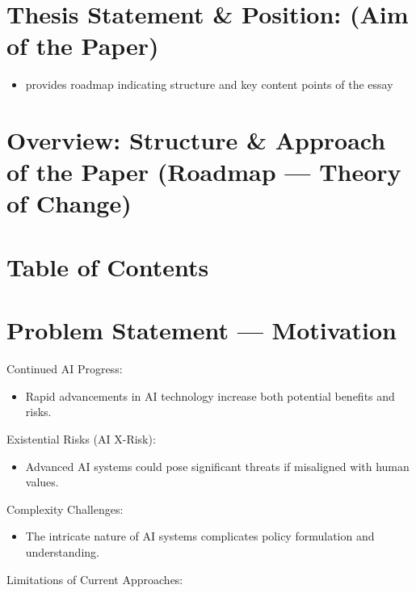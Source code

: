 \documentclass[
  letterpaper,
]{book}
\providecommand{\tightlist}{%
  \setlength{\itemsep}{0pt}\setlength{\parskip}{0pt}}
\begin{document}
\section{Thesis Statement \& Position: (Aim of the
Paper)}\label{thesis-statement-position-aim-of-the-paper}

\begin{itemize}
\tightlist
\item
  provides roadmap indicating structure and key content points of the
  essay
\end{itemize}

\section{Overview: Structure \& Approach of the Paper (Roadmap ---
Theory of
Change)}\label{overview-structure-approach-of-the-paper-roadmap-theory-of-change}

\section{Table of Contents}\label{table-of-contents}

\section{Problem Statement ---
Motivation}\label{problem-statement-motivation}

Continued AI Progress:

\begin{itemize}
\tightlist
\item
  Rapid advancements in AI technology increase both potential benefits
  and risks.
\end{itemize}

Existential Risks (AI X-Risk):

\begin{itemize}
\tightlist
\item
  Advanced AI systems could pose significant threats if misaligned with
  human values.
\end{itemize}

Complexity Challenges:

\begin{itemize}
\tightlist
\item
  The intricate nature of AI systems complicates policy formulation and
  understanding.
\end{itemize}

Limitations of Current Approaches:
\end{document}
